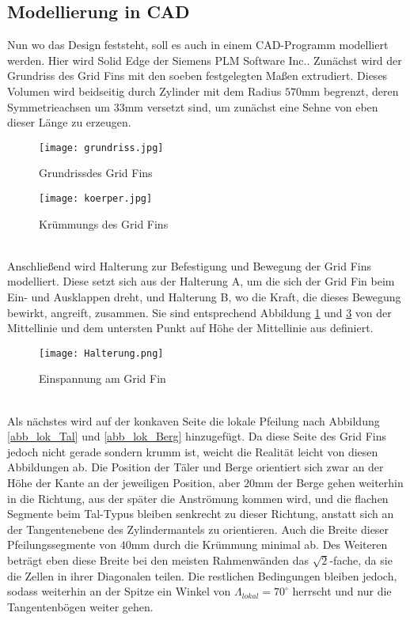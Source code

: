 \subsection{Modellierung in CAD}
Nun wo das Design feststeht, soll es auch in einem CAD-Programm modelliert werden. Hier wird Solid Edge der Siemens PLM Software Inc.. Zunächst wird der Grundriss des Grid Fins mit den soeben festgelegten Maßen extrudiert. Dieses Volumen wird beidseitig durch Zylinder mit dem Radius $570$mm begrenzt, deren Symmetrieachsen um $33$mm versetzt sind, um zunächst eine Sehne von eben dieser Länge zu erzeugen.
\begin{figure}[h]
	\centering
	\texttt{[image: grundriss.jpg]}
	\caption{Grundrissdes Grid Fins}
	\label{abb_grundriss}
\end{figure}
\begin{figure}[h]
\centering
\texttt{[image: koerper.jpg]}
\caption{Krümmungs des Grid Fins}
\label{abb_körper}
\end{figure}\\
Anschließend wird Halterung zur Befestigung und Bewegung der Grid Fins modelliert. Diese setzt sich aus der Halterung A, um die sich der Grid Fin beim Ein- und Ausklappen dreht, und Halterung B, wo die Kraft, die dieses Bewegung bewirkt, angreift, zusammen. Sie sind entsprechend Abbildung \ref{abb_grundriss} und \ref{abb_halterung} von der Mittellinie und dem untersten Punkt auf Höhe der Mittellinie aus definiert.
\begin{figure}[h]
	\centering
	\texttt{[image: Halterung.png]}
	\caption{Einspannung am Grid Fin}
	\label{abb_halterung}
\end{figure}\\
Als nächstes wird auf der konkaven Seite die lokale Pfeilung nach Abbildung \ref{abb_lok_Tal} und \ref{abb_lok_Berg} hinzugefügt. Da diese Seite des Grid Fins jedoch nicht gerade sondern krumm ist, weicht die Realität leicht von diesen Abbildungen ab. Die Position der Täler und Berge orientiert sich zwar an der Höhe der Kante an der jeweiligen Position, aber $20$mm der Berge gehen weiterhin in die Richtung, aus der später die Anströmung kommen wird, und die flachen Segmente beim Tal-Typus bleiben senkrecht zu dieser Richtung, anstatt sich an der Tangentenebene des Zylindermantels zu orientieren. Auch die Breite dieser Pfeilungssegmente von $40$mm durch die Krümmung minimal ab. Des Weiteren beträgt eben diese Breite bei den meisten Rahmenwänden das $\sqrt{2}$-fache, da sie die Zellen in ihrer Diagonalen teilen. Die restlichen Bedingungen bleiben jedoch, sodass weiterhin an der Spitze ein Winkel von $\Lambda_{lokal} = 70^\circ$ herrscht und nur die Tangentenbögen weiter gehen.

